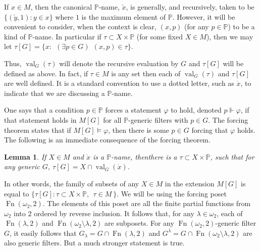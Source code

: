 \documentclass{amsart}
\theoremstyle{plain}
\newtheorem{lemma}[theorem]{Lemma}
\theoremstyle{definition}
\theoremstyle{remark}
\theoremstyle{plain}
\theoremstyle{definition}
\theoremstyle{remark}
\def\val{\operatorname{val}}
\begin{document}
            If $x\in M$, then the canonical
            $\mathbb P$-name, $\check x$, is generally, and recursively,
             taken to be
             $\{ (\check y, 1) : y\in x\}$ where $1$ is the maximum element of
             $\mathbb P$.  However, it will be convenient to consider, when the
            context is clear, $(x,p)$ (for any $p\in \mathbb P$)
            to be a kind of $\mathbb P$-name.
            In particular
            if $\tau \subset X\times \mathbb P$ (for some fixed $X\in M$),
            then we may let $\tau[G] = \{ x : ~~(\exists p\in
            G)~~(x,p)\in\tau\}$.


            Thus,  $\val_G(\tau)$ will denote the recursive evaluation by $G$ and
             $\tau[G]$ will be defined as above.
            In fact, if $\tau\in M$ is any set then each of
             $\val_G(\tau)$ and $\tau[G]$ are well defined.
            It is a standard convention to use a dotted letter, such
            as $\dot x$, to indicate that we are discussing a $\mathbb P$-name.

            One says that a condition $p\in \mathbb P$ forces a statement
            $\varphi$
              to hold, denoted $p\Vdash \varphi$,
            if that statement holds in $M[G]$ for all $\mathbb P$-generic filters
            with $p\in G$. The forcing theorem states that if $M[G]\models
            \varphi$,
             then there is some $p\in G$ forcing that $\varphi$ holds.
            The following is an immediate consequence of the forcing theorem.

            \begin{lemma} If $X\in M$ and $\dot x$ is a $\mathbb P$-name,
            then\label{easyname}
             there is a $\tau\subset X\times \mathbb P$, such that
            for any generic $G$, $\tau[G] = X\cap \val_G(\dot x)$.
            \end{lemma}

            In other words, the family of subsets of any $X\in M$ in
            the extension $M[G]$ is equal to
             $\{ \tau[G] : \tau \subset X\times \mathbb P, \ \
            \tau\in M\ \}$.  We will be using
            the forcing poset $\operatorname{Fn}(\omega_2, 2)$.
            The elements of this poset are all the finite partial functions
            from $\omega_2$ into $2$ ordered by reverse inclusion.
            It follows that, for any $\lambda\in \omega_2$,
             each of
             $\operatorname{Fn}(\lambda,2)$ and $\operatorname{Fn}(\omega_2\setminus
             \lambda,2)$ are subposets. For any
             $\operatorname{Fn}(\omega_2,2)$-generic
            filter  $G$, it easily follows that $G_\lambda = G\cap
            \operatorname{Fn}(\lambda,2)$ and
             $G^\lambda = G\cap
            \operatorname{Fn}(\omega_2\setminus
             \lambda,2)$ are also generic filters. But a much stronger statement is
             true.
\end{document}
